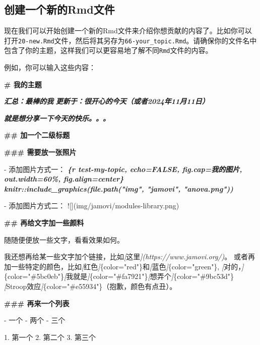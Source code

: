 \documentclass[]{ctexbook}
\newenvironment{Shaded}{\begin{snugshade}}{\end{snugshade}}
\newcommand{\AlertTok}[1]{\textcolor[rgb]{0.94,0.16,0.16}{#1}}
\newcommand{\CommentTok}[1]{\textcolor[rgb]{0.56,0.35,0.01}{\textit{#1}}}
\newcommand{\FunctionTok}[1]{\textcolor[rgb]{0.13,0.29,0.53}{\textbf{#1}}}
\newcommand{\InformationTok}[1]{\textcolor[rgb]{0.56,0.35,0.01}{\textbf{\textit{#1}}}}
\newcommand{\NormalTok}[1]{#1}
\newcommand{\OtherTok}[1]{\textcolor[rgb]{0.56,0.35,0.01}{#1}}
\newcommand{\SpecialStringTok}[1]{\textcolor[rgb]{0.31,0.60,0.02}{#1}}
\theoremstyle{definition}
\theoremstyle{definition}
\theoremstyle{definition}
\theoremstyle{definition}
\theoremstyle{remark}
\begin{document}
\subsection{创建一个新的Rmd文件}\label{ux521bux5efaux4e00ux4e2aux65b0ux7684rmdux6587ux4ef6}

现在我们可以开始创建一个新的Rmd文件来介绍你想贡献的内容了。比如你可以打开\texttt{20-new.Rmd}文件，然后将其另存为\texttt{66-your\_topic.Rmd}。请确保你的文件名中包含了你的主题，这样我们可以更容易地了解不同\texttt{Rmd}文件的内容。

例如，你可以输入这些内容：

\begin{Shaded}
\begin{Highlighting}[]
\FunctionTok{\# 我的主题}

\InformationTok{    汇总：最棒的我     }
\InformationTok{    更新于：很开心的今天（或者2024年11月11日）}

\InformationTok{    就是想分享一下今天的快乐。。。}

\FunctionTok{\#\# 加一个二级标题}


\FunctionTok{\#\#\# 需要放一张照片}

\SpecialStringTok{{-} }\NormalTok{添加图片方式一：}
\InformationTok{\textasciigrave{}\textasciigrave{}\textasciigrave{}\{r test{-}my{-}topic, echo=FALSE, fig.cap=\textquotesingle{}我的图片\textquotesingle{}, out.width=\textquotesingle{}60\%\textquotesingle{}, fig.align=\textquotesingle{}center\textquotesingle{}\}}
\InformationTok{knitr::include\_graphics(file.path("img", "jamovi", "anova.png"))}
\InformationTok{\textasciigrave{}\textasciigrave{}\textasciigrave{}}

\SpecialStringTok{{-} }\NormalTok{添加图片方式二：}
\AlertTok{![](img/jamovi/modules{-}library.png)}

\FunctionTok{\#\# 再给文字加一些颜料}

\NormalTok{随随便便放一些文字，看看效果如何。}

\NormalTok{我还想再给某一些文字加个链接，比如}\CommentTok{[}\OtherTok{这里}\CommentTok{](https://www.jamovi.org/)}\NormalTok{。}
\NormalTok{或者再加一些特定的颜色，比如}\CommentTok{[}\OtherTok{红色}\CommentTok{]}\NormalTok{\{color="red"\}和}\CommentTok{[}\OtherTok{蓝色}\CommentTok{]}\NormalTok{\{color="green"\},}
\CommentTok{[}\OtherTok{对的，}\CommentTok{]}\NormalTok{\{color="\#5bc0eb"\}}\CommentTok{[}\OtherTok{我就是}\CommentTok{]}\NormalTok{\{color="\#fa7921"\}}\CommentTok{[}\OtherTok{想弄个}\CommentTok{]}\NormalTok{\{color="\#9bc53d"\}}
\CommentTok{[}\OtherTok{Stroop效应}\CommentTok{]}\NormalTok{\{color="\#e55934"\}（抱歉，颜色有点丑）。}

\FunctionTok{\#\#\# 再来一个列表}

\SpecialStringTok{{-} }\NormalTok{一个}
\SpecialStringTok{{-} }\NormalTok{两个}
\SpecialStringTok{{-} }\NormalTok{三个}

\SpecialStringTok{1. }\NormalTok{第一个}
\SpecialStringTok{2. }\NormalTok{第二个}
\SpecialStringTok{3. }\NormalTok{第三个}
\end{Highlighting}
\end{Shaded}
\end{document}
